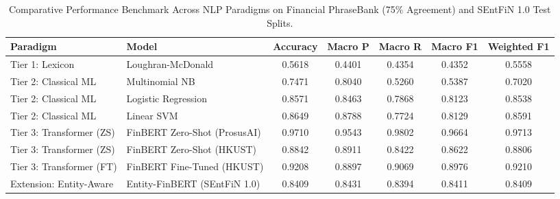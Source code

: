 \begin{table}[t]
\centering
\caption{Comparative Performance Benchmark Across NLP Paradigms on Financial PhraseBank (75\% Agreement) and SEntFiN 1.0 Test Splits.}
\label{tab:benchmark_results}
\begin{tabular}{llccccc}
\toprule
\textbf{Paradigm} & \textbf{Model} & \textbf{Accuracy} & \textbf{Macro P} & \textbf{Macro R} & \textbf{Macro F1} & \textbf{Weighted F1} \\
\midrule
Tier 1: Lexicon & Loughran-McDonald & 0.5618 & 0.4401 & 0.4354 & 0.4352 & 0.5558 \\
Tier 2: Classical ML & Multinomial NB & 0.7471 & 0.8040 & 0.5260 & 0.5387 & 0.7020 \\
Tier 2: Classical ML & Logistic Regression & 0.8571 & 0.8463 & 0.7868 & 0.8123 & 0.8538 \\
Tier 2: Classical ML & Linear SVM & 0.8649 & 0.8788 & 0.7724 & 0.8129 & 0.8591 \\
Tier 3: Transformer (ZS) & FinBERT Zero-Shot (ProsusAI) & 0.9710 & 0.9543 & 0.9802 & 0.9664 & 0.9713 \\
Tier 3: Transformer (ZS) & FinBERT Zero-Shot (HKUST) & 0.8842 & 0.8911 & 0.8422 & 0.8622 & 0.8806 \\
Tier 3: Transformer (FT) & FinBERT Fine-Tuned (HKUST) & 0.9208 & 0.8897 & 0.9069 & 0.8976 & 0.9210 \\
Extension: Entity-Aware & Entity-FinBERT (SEntFiN 1.0) & 0.8409 & 0.8431 & 0.8394 & 0.8411 & 0.8409 \\
\bottomrule
\end{tabular}
\end{table}
